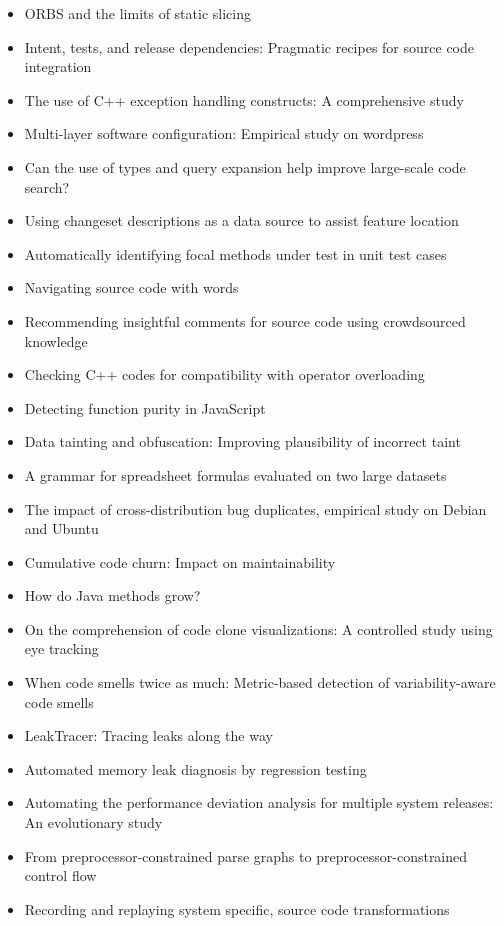 {\small
\begin{itemize}[itemsep=-1ex]
  \item ORBS and the limits of static slicing
  \item Intent, tests, and release dependencies: Pragmatic recipes for source code integration
  \item The use of C++ exception handling constructs: A comprehensive study
  \item Multi-layer software configuration: Empirical study on wordpress
  \item Can the use of types and query expansion help improve large-scale code search?
  \item Using changeset descriptions as a data source to assist feature location
  \item Automatically identifying focal methods under test in unit test cases
  \item Navigating source code with words
  \item Recommending insightful comments for source code using crowdsourced knowledge
  \item Checking C++ codes for compatibility with operator overloading
  \item Detecting function purity in JavaScript
  \item Data tainting and obfuscation: Improving plausibility of incorrect taint
  \item A grammar for spreadsheet formulas evaluated on two large datasets
  \item The impact of cross-distribution bug duplicates, empirical study on Debian and Ubuntu
  \item Cumulative code churn: Impact on maintainability
  \item How do Java methods grow?
  \item On the comprehension of code clone visualizations: A controlled study using eye tracking
  \item When code smells twice as much: Metric-based detection of variability-aware code smells
  \item LeakTracer: Tracing leaks along the way
  \item Automated memory leak diagnosis by regression testing
  \item Automating the performance deviation analysis for multiple system releases: An evolutionary study
  \item From preprocessor-constrained parse graphs to preprocessor-constrained control flow
  \item Recording and replaying system specific, source code transformations

\end{itemize}}
